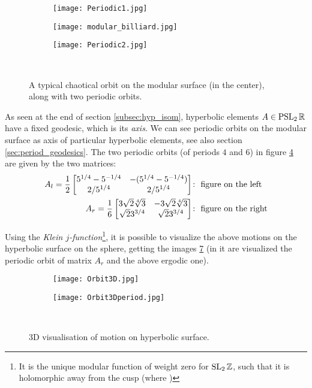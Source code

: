 \begin{figure}[H]
\centering
  \begin{subfigure}[b]{0.3\textwidth}
  \centering
    \texttt{[image: Periodic1.jpg]}
    \label{fig:mod_period_1}
  \end{subfigure}
  \begin{subfigure}[b]{0.3\textwidth}
  \centering
    \texttt{[image: modular\_billiard.jpg]}
    \label{fig:mod_erg}
  \end{subfigure}
    \begin{subfigure}[b]{0.3\textwidth}
  \centering
    \texttt{[image: Periodic2.jpg]}
    \label{fig:mod_period_2}
  \end{subfigure}	
  \noindent\\
  \decoRule
  \caption{A typical chaotical orbit on the modular surface (in the center), along with two periodic orbits.}
  \label{fig:modular_orbits}
\end{figure}


As seen at the end of section \ref{subsec:hyp_isom}, hyperbolic elements $A\in\operatorname{PSL}_{2}\mathbb{R}$ have a fixed geodesic, which is its \emph{axis}. We can see periodic orbits on the modular surface as axis of particular hyperbolic elements, see also section \ref{sec:period_geodesics}. The two periodic orbits (of periods $4$ and $6$) in figure \ref{fig:modular_orbits} are given by the two matrices:
\begin{align*}
A_{l}=\frac{1}{2}\begin{bmatrix} 5^{1/4}-5^{-1/4}&-(5^{1/4}-5^{-1/4})\\
2/5^{1/4}&2/5^{1/4} \end{bmatrix}&\colon\text{ figure on the left}\\
A_{r}=\frac{1}{6}\begin{bmatrix} 3\sqrt{2}\sqrt[4]{3}&-3\sqrt{2}\sqrt[4]{3}\\
\sqrt{2}3^{3/4}&\sqrt{2}3^{3/4} \end{bmatrix}&\colon\text{ figure on the right}
\end{align*}


Using the \emph{Klein $j$-function}\footnote{It is the unique modular function of weight zero for $\operatorname{SL}_{2}\mathbb{Z}$, such that it is holomorphic away from the cusp (where )}, it is possible to visualize the above motions on the hyperbolic surface on the sphere, getting the images \ref{fig:modular_orbits_3d} (in it are visualized the periodic orbit of matrix $A_{r}$ and the above ergodic one).


\begin{figure}[H]
\centering
  \begin{subfigure}[b]{0.3\textwidth}
  \centering
    \texttt{[image: Orbit3D.jpg]}
    \label{fig:mod_3d_erg}
  \end{subfigure}
  \begin{subfigure}[b]{0.3\textwidth}
  \centering
    \texttt{[image: Orbit3Dperiod.jpg]}
    \label{fig:mod_3d_period}
  \end{subfigure}
  \noindent\\
  \decoRule
  \caption{3D visualisation of motion on hyperbolic surface.}
  \label{fig:modular_orbits_3d}
\end{figure}


